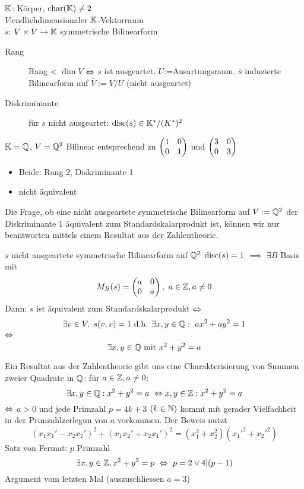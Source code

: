 \begin{Faz}
  $\mathbb{K}$: Körper, $\text{char}(\mathbb{K})\neq 2$\\
  $V$:endlichdimensionaler $\mathbb{K}$-Vektorraum\\
  $s$: $V\times V\to\mathbb{K}$ symmetrische Bilinearform
  \begin{description}
    \item[Rang] Rang < $\dim V$ $\Leftrightarrow$ $s$ ist ausgeartet. $U$:=Ausartungsraum. $\bar s$ induzierte Bilinearform auf $\bar V:=V/U$ (nicht ausgeartet)
    \item[Diskriminiante] für $s$ nicht ausgeartet: $\operatorname{disc}(s)\in\mathbb{K}^*/(K^*)^2$
  \end{description}
\end{Faz}
\begin{Bsp}
  $\mathbb{K}=\mathbb{Q}$, $V=\mathbb{Q}^2$ Bilinear entsprechend zu $\begin{pmatrix}1&0\\0&1\end{pmatrix}$ und $\begin{pmatrix}3&0\\0&3\end{pmatrix}$
  \begin{itemize}
    \item Beide: Rang 2, Diskriminante 1
    \item nicht äquivalent
  \end{itemize}
\end{Bsp}
\begin{Bem}
  Die Frage, ob eine nicht ausgeartete symmetrische Bilinearform auf $V:=\mathbb{Q}^2$ der Diskriminante 1 äquivalent zum Standardskalarprodukt ist, können wir nur beantworten mittels einem Resultat aus der Zahlentheorie.
\end{Bem}
\begin{Sat}
  $s$ nicht ausgeartete symmetrische Bilinearform auf $\mathbb{Q}^2$ $\operatorname{disc}(s)=1$ $\implies$ $\exists B$ Basis mit
  \[M_B(s)=\Mx{a&0\\0&a},\ a\in\mb{Z},a\neq 0\]
  Dann: $s$ ist äquivalent zum Standardskalarprodukt $\Leftrightarrow$
  \[\exists v\in V,\ s(v,v)=1\text{ d.h. }\exists x,y\in\mb{Q}:\ ax^2+ay^2=1\]
  $\Leftrightarrow$
  \[\exists x,y\in\mathbb{Q}\text{ mit }x^2+y^2=a\]
\end{Sat}
\begin{Bem}
  Ein Resultat aus der Zahlentheorie gibt uns eine Charakterisierung von Summen zweier Quadrate in $\mathbb{Q}$: für $a\in\mathbb{Z},a\neq 0$:
  \[\exists x,y\in\mathbb{Q}:x^2+y^2=a\ \Leftrightarrow x,y\in\mathbb{Z}:x^2+y^2=a\]
  $\Leftrightarrow$ $a>0$ und jede Primzahl $p=4k+3$ $(k\in\mathbb{N})$ kommt mit gerader Vielfachheit in der Primzahlzerlegun von $a$ vorkommen. Der Beweis nutzt
  \[(x_1x_1'-x_2x_2')^2+(x_1x_2'+x_2x_1')^2=(x_1^2+x_2^2)(x_1'^2+x_2'^2)\]
  Satz von Fermat: $p$ Primzahl 
  \[\exists x,y\in\mb{Z},x^2+y^2=p\ \Lra\ p=2\vee 4|(p-1)\]
  Argument vom letzten Mal (auszuschliessen $a=3$)
\end{Bem}
